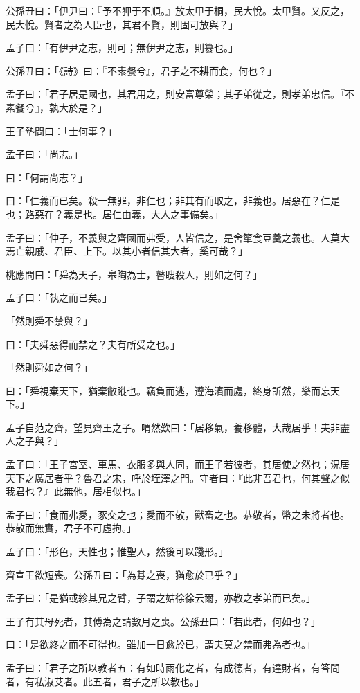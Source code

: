 \begin{pinyinscope}
公孫丑曰：「伊尹曰：『予不狎于不順。』放太甲于桐，民大悅。太甲賢。又反之，民大悅。賢者之為人臣也，其君不賢，則固可放與？」

孟子曰：「有伊尹之志，則可；無伊尹之志，則篡也。」

公孫丑曰：「《詩》曰：『不素餐兮』，君子之不耕而食，何也？」

孟子曰：「君子居是國也，其君用之，則安富尊榮；其子弟從之，則孝弟忠信。『不素餐兮』，孰大於是？」

王子墊問曰：「士何事？」

孟子曰：「尚志。」

曰：「何謂尚志？」

曰：「仁義而已矣。殺一無罪，非仁也；非其有而取之，非義也。居惡在？仁是也；路惡在？義是也。居仁由義，大人之事備矣。」

孟子曰：「仲子，不義與之齊國而弗受，人皆信之，是舍簞食豆羹之義也。人莫大焉亡親戚、君臣、上下。以其小者信其大者，奚可哉？」

桃應問曰：「舜為天子，皋陶為士，瞽瞍殺人，則如之何？」

孟子曰：「執之而已矣。」

「然則舜不禁與？」

曰：「夫舜惡得而禁之？夫有所受之也。」

「然則舜如之何？」

曰：「舜視棄天下，猶棄敝蹝也。竊負而逃，遵海濱而處，終身訢然，樂而忘天下。」

孟子自范之齊，望見齊王之子。喟然歎曰：「居移氣，養移體，大哉居乎！夫非盡人之子與？」

孟子曰：「王子宮室、車馬、衣服多與人同，而王子若彼者，其居使之然也；況居天下之廣居者乎？魯君之宋，呼於垤澤之門。守者曰：『此非吾君也，何其聲之似我君也？』此無他，居相似也。」

孟子曰：「食而弗愛，豕交之也；愛而不敬，獸畜之也。恭敬者，幣之未將者也。恭敬而無實，君子不可虛拘。」

孟子曰：「形色，天性也；惟聖人，然後可以踐形。」

齊宣王欲短喪。公孫丑曰：「為朞之喪，猶愈於已乎？」

孟子曰：「是猶或紾其兄之臂，子謂之姑徐徐云爾，亦教之孝弟而已矣。」

王子有其母死者，其傅為之請數月之喪。公孫丑曰：「若此者，何如也？」

曰：「是欲終之而不可得也。雖加一日愈於已，謂夫莫之禁而弗為者也。」

孟子曰：「君子之所以教者五：有如時雨化之者，有成德者，有達財者，有答問者，有私淑艾者。此五者，君子之所以教也。」


\end{pinyinscope}
